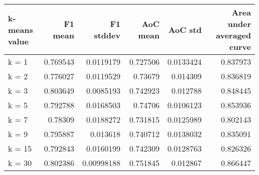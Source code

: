 \begin{tabular}{lrrrrr}
\toprule
 k-means value   &   F1 mean &   F1 stddev &   AoC mean &   AoC std &   Area under averaged curve \\
\midrule
 k = 1           &  0.769543 &  0.0119179  &   0.727506 & 0.0133424 &                    0.837973 \\
 k = 2           &  0.776027 &  0.0119529  &   0.73679  & 0.014309  &                    0.836819 \\
 k = 3           &  0.803649 &  0.0085193  &   0.742923 & 0.012788  &                    0.848445 \\
 k = 5           &  0.792788 &  0.0168503  &   0.74706  & 0.0106123 &                    0.853936 \\
 k = 7           &  0.78309  &  0.0188272  &   0.731815 & 0.0125989 &                    0.802143 \\
 k = 9           &  0.795887 &  0.013618   &   0.740712 & 0.0138032 &                    0.835091 \\
 k = 15          &  0.792843 &  0.0160199  &   0.742309 & 0.0128763 &                    0.826326 \\
 k = 30          &  0.802386 &  0.00998188 &   0.751845 & 0.012867  &                    0.866447 \\
\bottomrule
\end{tabular}